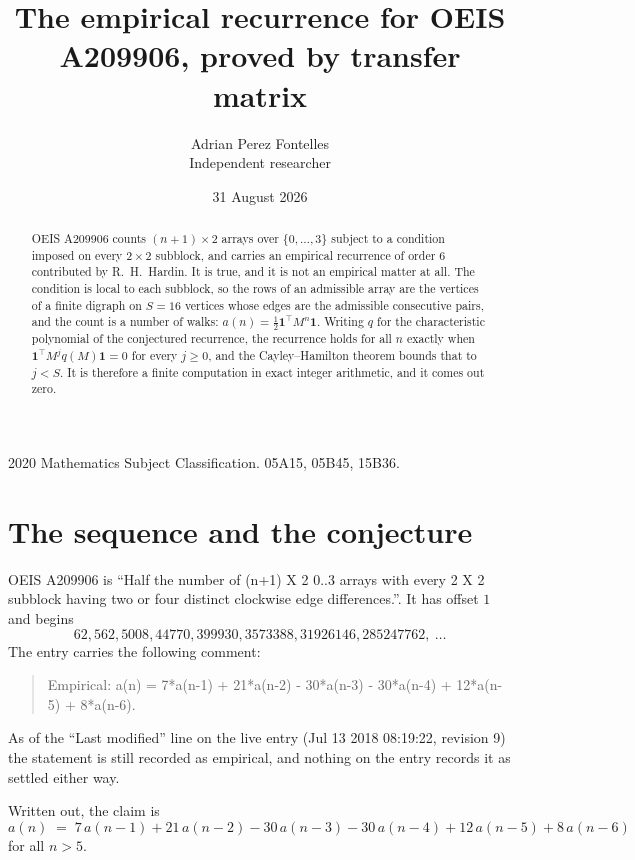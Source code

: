 \documentclass[11pt,a4paper]{article}
\title{The empirical recurrence for OEIS A209906, proved by transfer matrix}
\author{Adrian Perez Fontelles\\ \small Independent researcher}
\date{31 August 2026}
\theoremstyle{plain}
\theoremstyle{definition}
\begin{document}
\maketitle

\begin{abstract}
OEIS A209906 counts $(n+1)\times2$ arrays over $\{0,\dots,3\}$ subject to a condition imposed on
every $2\times2$ subblock, and carries an empirical recurrence of order $6$ contributed
by R.~H.~Hardin. It is true, and it is not an empirical matter at all. The condition is local
to each subblock, so the rows of an admissible array are the vertices of a finite digraph
on $S=16$ vertices whose edges are the admissible consecutive pairs, and the count is a
number of walks: $a(n)=\tfrac1{2}\mathbf{1}^{\!\top}M^{n}\mathbf{1}$. Writing $q$
for the characteristic polynomial of the conjectured recurrence, the recurrence holds for all
$n$ exactly when $\mathbf{1}^{\!\top}M^{j}q(M)\mathbf{1}=0$ for every $j\ge0$, and the
Cayley--Hamilton theorem bounds that to $j<S$. It is therefore a finite computation in exact
integer arithmetic, and it comes out zero.
\end{abstract}

\noindent\small 2020 Mathematics Subject Classification. 05A15, 05B45, 15B36.\normalsize

\section{The sequence and the conjecture}

OEIS A209906 is ``Half the number of (n+1) X 2 0..3 arrays with every 2 X 2 subblock having two or four distinct clockwise edge differences.''. It has offset $1$ and begins
\[
62, 562, 5008, 44770, 399930, 3573388, 31926146, 285247762,\ \dots
\]
The entry carries the following comment:
\begin{quote}\small
Empirical: a(n) = 7*a(n-1) + 21*a(n-2) - 30*a(n-3) - 30*a(n-4) + 12*a(n-5) + 8*a(n-6).
\end{quote}
As of the ``Last modified'' line on the live entry (Jul 13 2018 08:19:22, revision 9) the statement is
still recorded as empirical, and nothing on the entry records it as settled either way.

Written out, the claim is
\begin{equation}\label{eq:conj}
a(n)\;=\;7\,a(n-1) + 21\,a(n-2) - 30\,a(n-3) - 30\,a(n-4) + 12\,a(n-5) + 8\,a(n-6)
\end{equation}
for all $n>5$.
\end{document}
